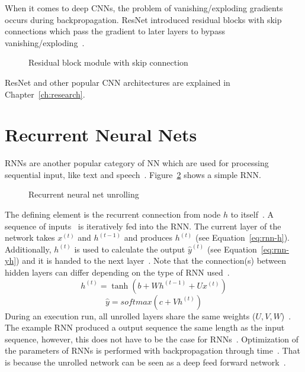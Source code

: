 When it comes to deep \acp{CNN}, the problem of vanishing/exploding gradients occurs during
backpropagation.
ResNet introduced residual blocks with skip connections which pass the gradient to later layers
to bypass vanishing/exploding~\citep{he_deep_2015}.
\begin{figure}[ht]
    \centering
    \caption{Residual block module with skip connection~\citep{he_deep_2015}\label{fig:skip-conn}}
\end{figure}
ResNet and other popular \ac{CNN} architectures are explained in Chapter~\ref{ch:research}.

\section{Recurrent Neural Nets}
\acp{RNN} are another popular category of \ac{NN} which are used for processing sequential input,
like text and speech~\citep{chauhan_review_2018}.
Figure~\ref{fig:rnn-unrolling} shows a simple \ac{RNN}.
\begin{figure}[ht]
    \centering
    \caption{Recurrent neural net unrolling~\citep{goodfellow_deep_2016}\label{fig:rnn-unrolling}}
\end{figure}
The defining element is the recurrent connection from node $h$ to itself~\citep{goodfellow_deep_2016}.
A sequence of inputs \x\ is iteratively fed into the \ac{RNN}.
The current layer of the network takes $x^{(t)}$ and $h^{(t-1)}$ and produces $h^{(t)}$
(see Equation~\ref{eq:rnn-h}).
Additionally, $h^{(t)}$ is used to calculate the output $\hat{y}^{(t)}$ (see Equation~\ref{eq:rnn-yh})
and it is handed to the next layer~\citep{goodfellow_deep_2016}.
Note that the connection(s) between hidden layers can differ depending on the type of \ac{RNN}
used~\citep{goodfellow_deep_2016}.
\begin{equation}\label{eq:rnn-h}
    h^{(t)} = \tanh(b+Wh^{(t-1)}+Ux^{(t)})
\end{equation}
\begin{equation}\label{eq:rnn-yh}
    \hat{y} = softmax(c + Vh^{(t)})
\end{equation}
During an execution run, all unrolled layers share the same weights ($U,V,W$)~\citep{chauhan_review_2018}.
The example \ac{RNN} produced a output sequence the same length as the input
sequence, however, this does not have to be the case for \acp{RNN}~\citep{goodfellow_deep_2016}.
Optimization of the parameters of \acp{RNN} is performed with backpropagation through
time~\citep{sherstinsky_fundamentals_2020}.
That is because the unrolled network can be seen as a deep feed forward
network~\citep{chauhan_review_2018}.

